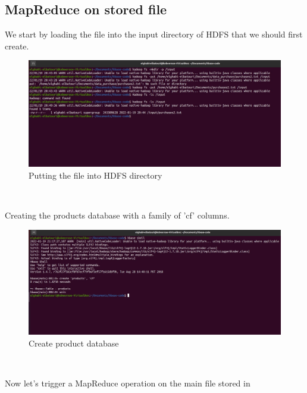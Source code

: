 \begin{spacing}{1.2}
\newpage
\section{MapReduce on stored file }
\par We start by loading the file into the input directory of HDFS that we should first create.
\\
\begin{figure}[!htb] 
\begin{center} 
\includegraphics[width=1\linewidth]{Pictures/HBase/Using the HBase Java API/MapReduce on stored file/Putting the file into HDFS directory} 
\end{center} 
\caption{Putting the file into HDFS directory} 
\end{figure}  \FloatBarrier
\\
\par Creating the products database with a family of 'cf' columns.
\\
\begin{figure}[!htb] 
\begin{center} 
\includegraphics[width=1\linewidth]{Pictures/HBase/Using the HBase Java API/MapReduce on stored file/Create product database} 
\end{center} 
\caption{Create product database} 
\end{figure}  \FloatBarrier
\\
\newpage
\par Now let's trigger a MapReduce operation on the main file stored in

\end{spacing}
